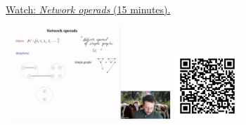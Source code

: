 
\begin{minipage}{10cm}
    \href{https://act4e-spring21.netlify.app/videos/spring2021-operads-b:network-operad.html}{Watch: \emph{Network operads} (15 minutes).}
        
    \href{https://act4e-spring21.netlify.app/videos/spring2021-operads-b:network-operad.html}{\includegraphics[height=3.5cm]{spring2021-operads-b:network-operad/thumbnails.jpg}}
    \href{https://act4e-spring21.netlify.app/videos/spring2021-operads-b:network-operad.html}{\includegraphics[height=2.5cm]{spring2021-operads-b:network-operad/qrcode.png}}
\end{minipage}
